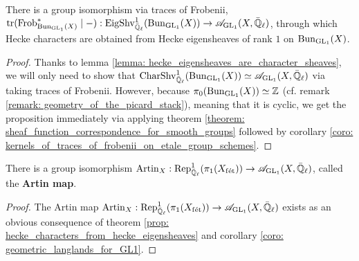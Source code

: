             \begin{proposition} \label{prop: hecke_characters_from_hecke_eigensheaves}
                There is a group isomorphism via traces of Frobenii, $\operatorname{tr}(\mathrm{Frob}_{\mathrm{Bun}_{\operatorname{GL}_1}(X)}^* \mid -): \mathrm{Eig}\mathrm{Shv}_{\bar{\mathbb{Q}}_{\ell}}^1(\mathrm{Bun}_{\operatorname{GL}_1}(X)) \to \mathscr{A}_{\operatorname{GL}_1}(X, \bar{\mathbb{Q}}_{\ell})$, through which Hecke characters are obtained from Hecke eigensheaves of rank $1$ on $\mathrm{Bun}_{\operatorname{GL}_1}(X)$.
            \end{proposition}
                \begin{proof}
                    Thanks to lemma \ref{lemma: hecke_eigensheaves_are_character_sheaves}, we will only need to show that $\mathrm{Char}\mathrm{Shv}_{\bar{\mathbb{Q}}_{\ell}}^1(\mathrm{Bun}_{\operatorname{GL}_1}(X)) \simeq \mathscr{A}_{\operatorname{GL}_1}(X, \bar{\mathbb{Q}}_{\ell})$ via taking traces of Frobenii. However, because $\pi_0(\mathrm{Bun}_{\operatorname{GL}_1}(X)) \simeq \mathbb{Z}$ (cf. remark \ref{remark: geometry_of_the_picard_stack}), meaning that it is cyclic, we get the proposition immediately via applying theorem \ref{theorem: sheaf_function_correspondence_for_smooth_groups} followed by corollary \ref{coro: kernels_of_traces_of_frobenii_on_etale_group_schemes}.
                \end{proof}
            
            \begin{theorem} \label{theorem: artin_reciprocity_for_function_fields_over_finite_fields}
                \cite[Theorem VI.5.5]{neukirch_2010_algebraic_number_theory} There is a group isomorphism $\mathrm{Artin}_X: \mathrm{Rep}^1_{\bar{\mathbb{Q}}_{\ell}}(\pi_1(X_{\mathrm{f\acute{e}t}})) \to \mathscr{A}_{\operatorname{GL}_1}(X, \bar{\mathbb{Q}}_{\ell})$, called the \textbf{Artin map}.
            \end{theorem}
                \begin{proof}
                    The Artin map $\mathrm{Artin}_X: \mathrm{Rep}^1_{\bar{\mathbb{Q}}_{\ell}}(\pi_1(X_{\mathrm{f\acute{e}t}})) \to \mathscr{A}_{\operatorname{GL}_1}(X, \bar{\mathbb{Q}}_{\ell})$ exists as an obvious consequence of theorem \ref{prop: hecke_characters_from_hecke_eigensheaves} and corollary \ref{coro: geometric_langlands_for_GL1}. 
                \end{proof}
                
